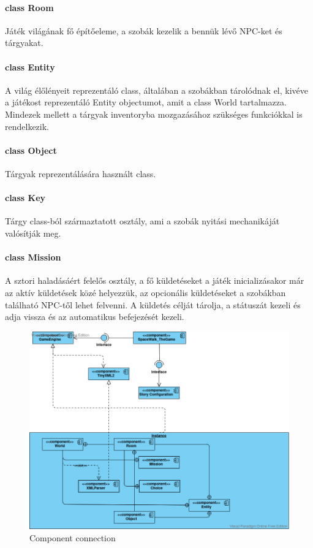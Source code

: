 \documentclass{scrarticle}
\begin{document}
\paragraph{class Room}
Játék világának fő építőeleme, a szobák kezelik a bennük lévő NPC-ket és tárgyakat.
\paragraph{class Entity}
A világ élőlényeit reprezentáló class, általában a szobákban tárolódnak el, kivéve a játékost reprezentáló Entity objectumot, amit a class World tartalmazza. Mindezek mellett a tárgyak inventoryba mozgazásához szükséges funkciókkal is rendelkezik.
\paragraph{class Object}
Tárgyak reprezentálására használt class.
\paragraph{class Key}
Tárgy class-ból származtatott osztály, ami a szobák nyitási mechanikáját valósítják meg.
\paragraph{class Mission}
A sztori haladásáért felelős osztály, a fő küldetéseket a játék inicializásakor már az aktív küldetések közé helyezzük, az opcionális küldetéseket a szobákban található NPC-től lehet felvenni. A küldetés célját tárolja, a státuszát kezeli és adja vissza és az automatikus befejezését kezeli.

\begin{figure}[H]
    \includegraphics[width=0.75\columnwidth]{Component_Connection.jpg}
    \caption{Component connection}\label{fig:3}
\end{figure}
\end{document}
